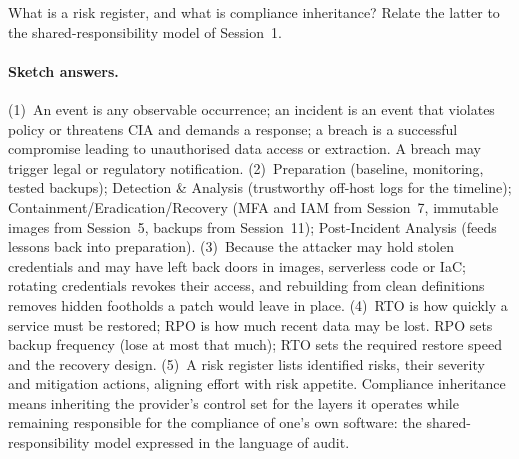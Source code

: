 \begin{exercise}
What is a risk register, and what is compliance inheritance? Relate the
latter to the shared-responsibility model of Session~1.
\end{exercise}

\paragraph{Sketch answers.}
{\small
(1)~An event is any observable occurrence; an incident is an event that
violates policy or threatens CIA and demands a response; a breach is a
successful compromise leading to unauthorised data access or extraction. A
breach may trigger legal or regulatory notification. (2)~Preparation
(baseline, monitoring, tested backups); Detection \& Analysis (trustworthy
off-host logs for the timeline); Containment/Eradication/Recovery (MFA and IAM
from Session~7, immutable images from Session~5, backups from Session~11);
Post-Incident Analysis (feeds lessons back into preparation). (3)~Because the
attacker may hold stolen credentials and may have left back doors in images,
serverless code or IaC; rotating credentials revokes their access, and
rebuilding from clean definitions removes hidden footholds a patch would leave
in place. (4)~RTO is how quickly a service must be restored; RPO is how much
recent data may be lost. RPO sets backup frequency (lose at most that much);
RTO sets the required restore speed and the recovery design. (5)~A risk
register lists identified risks, their severity and mitigation actions,
aligning effort with risk appetite. Compliance inheritance means inheriting
the provider's control set for the layers it operates while remaining
responsible for the compliance of one's own software: the
shared-responsibility model expressed in the language of audit.}


